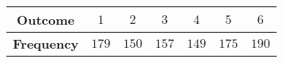 \begin{tabular}{|c|c|c|c|c|c|c|}

\hline
\textbf{Outcome} & $1$ & $2$ & $3$ & $4$ & $5$ & $6$ \\

\hline
\textbf{Frequency}&  $179$ & $150$ & $157$ & $149$ & $175$ & $190$ \\

\hline

\end{tabular}